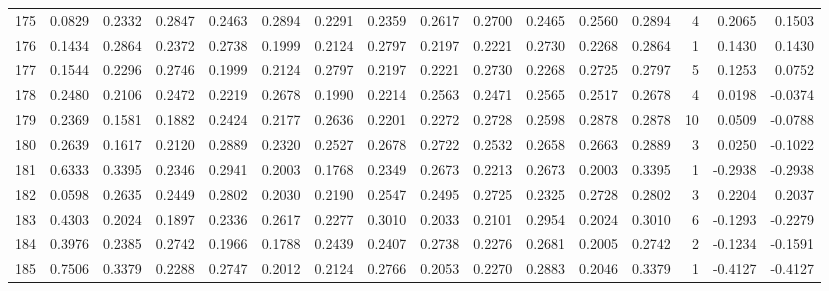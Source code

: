 \begin{tabular}{lrrrrrrrrrrrrrrr}
175 &      0.0829 &  0.2332 &  0.2847 &  0.2463 &  0.2894 &  0.2291 &  0.2359 &  0.2617 &  0.2700 &  0.2465 &   0.2560 &     0.2894 &      4 &                    0.2065 &                     0.1503 \\
176 &      0.1434 &  0.2864 &  0.2372 &  0.2738 &  0.1999 &  0.2124 &  0.2797 &  0.2197 &  0.2221 &  0.2730 &   0.2268 &     0.2864 &      1 &                    0.1430 &                     0.1430 \\
177 &      0.1544 &  0.2296 &  0.2746 &  0.1999 &  0.2124 &  0.2797 &  0.2197 &  0.2221 &  0.2730 &  0.2268 &   0.2725 &     0.2797 &      5 &                    0.1253 &                     0.0752 \\
178 &      0.2480 &  0.2106 &  0.2472 &  0.2219 &  0.2678 &  0.1990 &  0.2214 &  0.2563 &  0.2471 &  0.2565 &   0.2517 &     0.2678 &      4 &                    0.0198 &                    -0.0374 \\
179 &      0.2369 &  0.1581 &  0.1882 &  0.2424 &  0.2177 &  0.2636 &  0.2201 &  0.2272 &  0.2728 &  0.2598 &   0.2878 &     0.2878 &     10 &                    0.0509 &                    -0.0788 \\
180 &      0.2639 &  0.1617 &  0.2120 &  0.2889 &  0.2320 &  0.2527 &  0.2678 &  0.2722 &  0.2532 &  0.2658 &   0.2663 &     0.2889 &      3 &                    0.0250 &                    -0.1022 \\
181 &      0.6333 &  0.3395 &  0.2346 &  0.2941 &  0.2003 &  0.1768 &  0.2349 &  0.2673 &  0.2213 &  0.2673 &   0.2003 &     0.3395 &      1 &                   -0.2938 &                    -0.2938 \\
182 &      0.0598 &  0.2635 &  0.2449 &  0.2802 &  0.2030 &  0.2190 &  0.2547 &  0.2495 &  0.2725 &  0.2325 &   0.2728 &     0.2802 &      3 &                    0.2204 &                     0.2037 \\
183 &      0.4303 &  0.2024 &  0.1897 &  0.2336 &  0.2617 &  0.2277 &  0.3010 &  0.2033 &  0.2101 &  0.2954 &   0.2024 &     0.3010 &      6 &                   -0.1293 &                    -0.2279 \\
184 &      0.3976 &  0.2385 &  0.2742 &  0.1966 &  0.1788 &  0.2439 &  0.2407 &  0.2738 &  0.2276 &  0.2681 &   0.2005 &     0.2742 &      2 &                   -0.1234 &                    -0.1591 \\
185 &      0.7506 &  0.3379 &  0.2288 &  0.2747 &  0.2012 &  0.2124 &  0.2766 &  0.2053 &  0.2270 &  0.2883 &   0.2046 &     0.3379 &      1 &                   -0.4127 &                    -0.4127 \\

\end{tabular}
